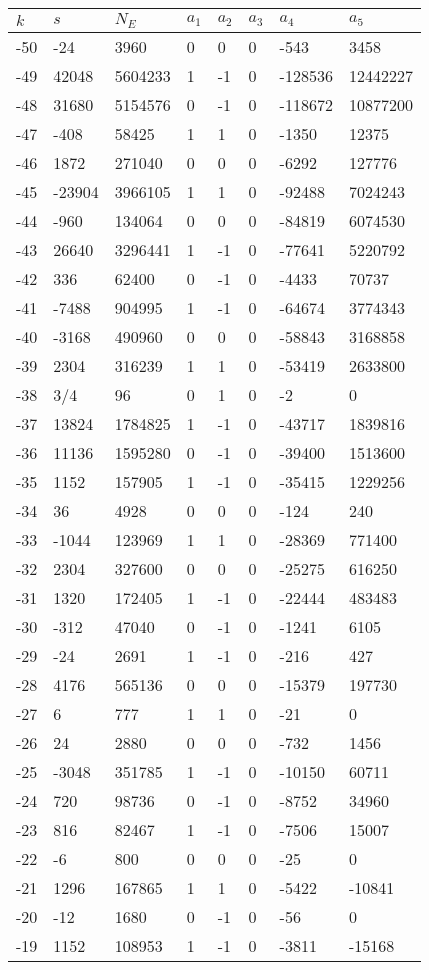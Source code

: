\documentclass{amsart}
\begin{document}
\begin{longtable}{|l|l|l|lllll|}
\hline
$k$ & $s$ & $N_E$ & $a_1$ & $a_2$ & $a_3$ & $a_4$ & $a_5$\\
\hline
-50&-24&3960&0&0&0&-543&3458\\
-49&42048&5604233&1&-1&0&-128536&12442227\\
-48&31680&5154576&0&-1&0&-118672&10877200\\
-47&-408&58425&1&1&0&-1350&12375\\
-46&1872&271040&0&0&0&-6292&127776\\
-45&-23904&3966105&1&1&0&-92488&7024243\\
-44&-960&134064&0&0&0&-84819&6074530\\
-43&26640&3296441&1&-1&0&-77641&5220792\\
-42&336&62400&0&-1&0&-4433&70737\\
-41&-7488&904995&1&-1&0&-64674&3774343\\
-40&-3168&490960&0&0&0&-58843&3168858\\
-39&2304&316239&1&1&0&-53419&2633800\\
-38&3/4&96&0&1&0&-2&0\\
-37&13824&1784825&1&-1&0&-43717&1839816\\
-36&11136&1595280&0&-1&0&-39400&1513600\\
-35&1152&157905&1&-1&0&-35415&1229256\\
-34&36&4928&0&0&0&-124&240\\
-33&-1044&123969&1&1&0&-28369&771400\\
-32&2304&327600&0&0&0&-25275&616250\\
-31&1320&172405&1&-1&0&-22444&483483\\
-30&-312&47040&0&-1&0&-1241&6105\\
-29&-24&2691&1&-1&0&-216&427\\
-28&4176&565136&0&0&0&-15379&197730\\
-27&6&777&1&1&0&-21&0\\
-26&24&2880&0&0&0&-732&1456\\
-25&-3048&351785&1&-1&0&-10150&60711\\
-24&720&98736&0&-1&0&-8752&34960\\
-23&816&82467&1&-1&0&-7506&15007\\
-22&-6&800&0&0&0&-25&0\\
-21&1296&167865&1&1&0&-5422&-10841\\
-20&-12&1680&0&-1&0&-56&0\\
-19&1152&108953&1&-1&0&-3811&-15168\\

\end{longtable}
\end{document}
